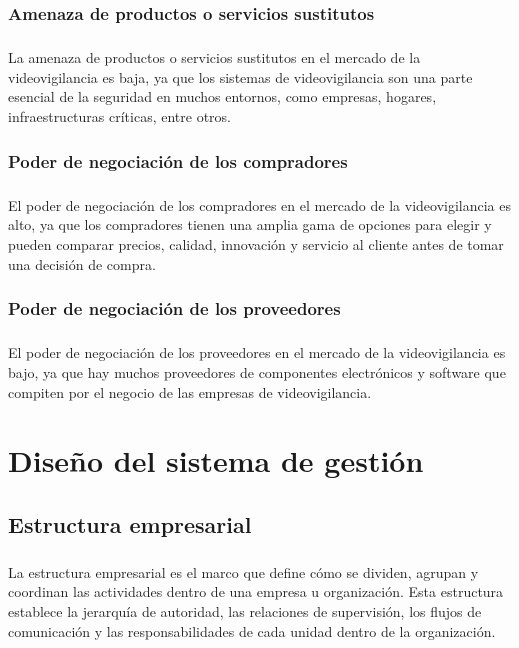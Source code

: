 \documentclass{report}
\begin{document}
        \subsection*{Amenaza de productos o servicios sustitutos}
          \paragraph*{}{La amenaza de productos o servicios sustitutos en el mercado de la videovigilancia es baja, ya que los sistemas de videovigilancia son una parte esencial de la seguridad en muchos entornos, como empresas, hogares, infraestructuras críticas, entre otros.}
        \subsection*{Poder de negociación de los compradores}
          \paragraph*{}{El poder de negociación de los compradores en el mercado de la videovigilancia es alto, ya que los compradores tienen una amplia gama de opciones para elegir y pueden comparar precios, calidad, innovación y servicio al cliente antes de tomar una decisión de compra.}
        \subsection*{Poder de negociación de los proveedores}
          \paragraph*{}{El poder de negociación de los proveedores en el mercado de la videovigilancia es bajo, ya que hay muchos proveedores de componentes electrónicos y software que compiten por el negocio de las empresas de videovigilancia.}
    \chapter{Diseño del sistema de gestión}
        \section{Estructura empresarial}
          \paragraph*{}{
            La estructura empresarial es el marco que define cómo se dividen, agrupan y coordinan las actividades dentro de una empresa u organización. 
            Esta estructura establece la jerarquía de autoridad, las relaciones de supervisión, los flujos de comunicación y las responsabilidades de cada unidad dentro de la organización.
          }
\end{document}

